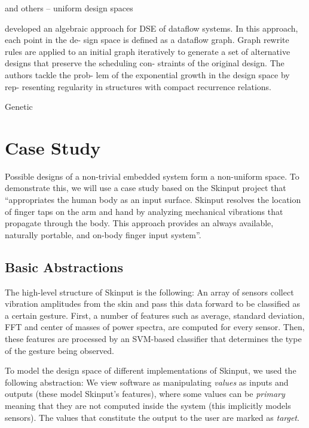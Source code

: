 \documentclass[conference]{IEEEtran}
\begin{document}
\cite{Mariani2010,Ascia2007} and others -- uniform design spaces

\cite{Kakita2006} developed an algebraic approach for DSE
of dataflow systems. In this approach, each point in the de-
sign space is defined as a dataflow graph. Graph rewrite
rules are applied to an initial graph iteratively to generate a
set of alternative designs that preserve the scheduling con-
straints of the original design. The authors tackle the prob-
lem of the exponential growth in the design space by rep-
resenting regularity in structures with compact recurrence
relations. 


\cite{Salcic2007} Genetic

\section{Case Study} \label{CaseStudy}

Possible designs of a non-trivial embedded system form a non-uniform space. To demonstrate this, we will use a case study based on the Skinput project \cite{Harrison2010} that ``appropriates the human body as an input surface. Skinput resolves the location of finger taps on the arm and hand by analyzing mechanical vibrations that propagate through the body. This approach provides an always available, naturally portable, and on-body finger input system''.

\subsection{Basic Abstractions}

The high-level structure of Skinput is the following: An array of sensors collect vibration amplitudes from the skin and pass this data forward to be classified as a certain gesture. First, a number of features such as average, standard deviation, FFT and center of masses of power spectra, are computed for every sensor. Then, these features are processed by an \mbox{SVM-based} classifier that determines the type of the gesture being observed.

To model the design space of different implementations of Skinput, we used the following abstraction: We view software as manipulating \emph{values} as inputs and outputs (these model Skinput's features), where some values can be \emph{primary} meaning that they are not computed inside the system (this implicitly models sensors). The values that constitute the output to the user are marked as \emph{target}. 
\end{document}
